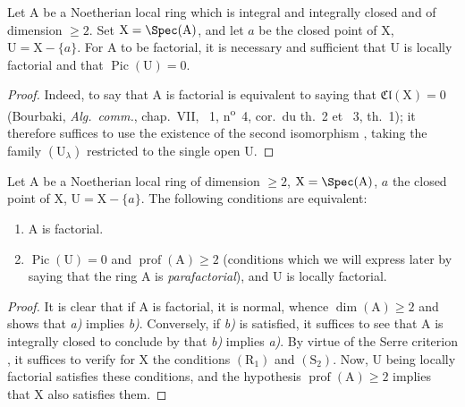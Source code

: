 \begin{corollary}[21.6.13]
\label{IV.21.6.13}
Let $\mathrm{A}$ be a Noetherian local ring which is integral and integrally closed and of dimension $\geq 2$.
Set $\mathrm{X}=\Spec(\mathrm{A})$, and let $a$ be the closed point of $\mathrm{X}$, $\mathrm{U}=\mathrm{X}-\{a\}$.
For $\mathrm{A}$ to be factorial, it is necessary and sufficient that $\mathrm{U}$ is locally factorial and that $\operatorname{Pic}(\mathrm{U})=0$.
\end{corollary}

\begin{proof}
Indeed, to say that $\mathrm{A}$ is factorial is equivalent to saying that $\mathfrak{Cl}(\mathrm{X})=0$ (Bourbaki, \emph{Alg.\ comm.}, chap.~VII, \textsection~1, n\textsuperscript{o}~4, cor.\ du th.~2 et \textsection~3, th.~1);
it therefore suffices to use the existence of the second isomorphism , taking the family $(\mathrm{U}_\lambda)$ restricted to the single open $\mathrm{U}$.
\end{proof}

\begin{corollary}[21.6.14]
\label{IV.21.6.14}
Let $\mathrm{A}$ be a Noetherian local ring of dimension $\geq 2$, $\mathrm{X}=\Spec(\mathrm{A})$, $a$ the closed point of $\mathrm{X}$, $\mathrm{U}=\mathrm{X}-\{a\}$.
The following conditions are equivalent:
\begin{enumerate}[label=\emph{\alph*)}]
  \item $\mathrm{A}$ is factorial.
  \item $\operatorname{Pic}(\mathrm{U})=0$ and $\operatorname{prof}(\mathrm{A})\geq 2$ (conditions which we will express later  by saying that the ring $\mathrm{A}$ is \emph{parafactorial}), and $\mathrm{U}$ is locally factorial.
\end{enumerate}
\end{corollary}

\begin{proof}
It is clear that if $\mathrm{A}$ is factorial, it is normal, whence $\dim(\mathrm{A})\geq 2$  and  shows that \emph{a)} implies \emph{b)}.
Conversely, if \emph{b)} is satisfied, it suffices to see that $\mathrm{A}$ is integrally closed to conclude by  that \emph{b)} implies \emph{a)}.
By virtue of the Serre criterion , it suffices to verify for $\mathrm{X}$ the conditions $(\mathrm{R}_1)$ and $(\mathrm{S}_2)$.
Now, $\mathrm{U}$ being locally factorial satisfies these conditions, and the hypothesis $\operatorname{prof}(\mathrm{A})\geq 2$ implies that $\mathrm{X}$ also satisfies them.
\end{proof}


